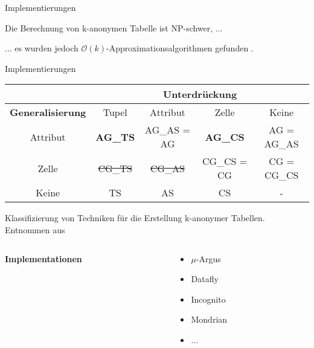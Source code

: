 \begin{frame}[c]{Implementierungen}
	\begin{center}
		Die Berechnung von k-anonymen Tabelle ist NP-schwer, ...\\
		\pause
		\vspace{0.5cm}

		... es wurden jedoch \(\mathcal{O}(k)\)-Approximationsalgorithmen gefunden \cite{aggarwal, meyerson}.
	\end{center}
\end{frame}
	
\begin{frame}{Implementierungen}
	\begin{center}
		\begin{tabular}{|c||c|c|c|c|}
			\hline & \multicolumn{4}{c|}{\textbf{Unterdrückung}}\\
			\hline \textbf{Generalisierung} & Tupel & Attribut & Zelle & Keine \\ \hline
			\hline Attribut & \textbf{AG\_TS} & AG\_AS \tiny = AG & \textbf{AG\_CS} & AG \tiny = AG\_AS \\ 
			\hline Zelle & \sout{CG\_TS} & \sout{CG\_AS} & CG\_CS \tiny = CG & CG \tiny = CG\_CS\\ 
			\hline Keine & TS & AS & CS & - \\ 
			\hline 
		\end{tabular} 
		\vspace{0.2cm}
	
		\tiny Klassifizierung von Techniken für die Erstellung k-anonymer Tabellen. Entnommen aus \cite{Ciriani}
	\end{center}

	\pause

	\begin{columns}[c]
		\begin{column}{0.5\textwidth}	
			\hfill \textbf{Implementationen}
		\end{column}
	
		\begin{column}{0.5\textwidth}
			\begin{itemize}
				\item \(\mu\)-Argus
				\item Datafly
				\item Incognito
				\item Mondrian
				\item ...
			\end{itemize}
		\end{column}
	\end{columns}
\end{frame}


